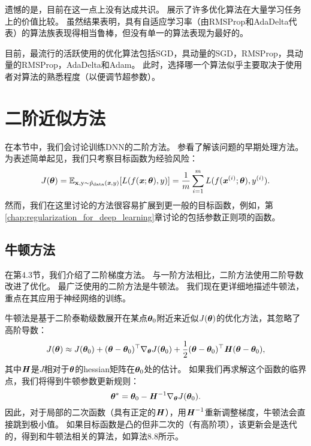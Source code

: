 遗憾的是，目前在这一点上没有达成共识。
\cite{Schaul2014_unittests}展示了许多优化算法在大量学习任务上的价值比较。
虽然结果表明，具有自适应学习率（由RMSProp和AdaDelta代表）的算法族表现得相当鲁棒，但没有单一的算法表现为最好的。

目前，最流行的活跃使用的优化算法包括SGD，具动量的SGD，RMSProp，具动量的RMSProp，AdaDelta和Adam。
此时，选择哪一个算法似乎主要取决于使用者对算法的熟悉程度（以便调节超参数）。

\section{二阶近似方法}
\label{sec:approximate_second_order_methods}
在本节中，我们会讨论训练\gls{DNN}的二阶方法。
参看\cite{lecun1998mnist}了解该问题的早期处理方法。
为表述简单起见，我们只考察目标函数为经验风险：
\begin{equation}
    J(\boldsymbol{\theta}) = \mathbb{E}_{\mathbf{x}, \mathrm{y} \sim \hat{p}_{\text{data}}(\boldsymbol{\mathit{x}},y) } [ L(f(\boldsymbol{\mathit{x}}; \boldsymbol{\theta}), y) ] =
\frac{1}{m} \sum_{i=1}^m L(f(\boldsymbol{\mathit{x}}^{(i)}; \boldsymbol{\theta}), y^{(i)}).
\end{equation}
然而，我们在这里讨论的方法很容易扩展到更一般的目标函数，例如，第\ref{chap:regularization_for_deep_learning}章讨论的包括参数正则项的函数。


\subsection{牛顿方法}
\label{sec:newton_method}
在第4.3节，我们介绍了二阶梯度方法。
与一阶方法相比，二阶方法使用二阶导数改进了优化。
最广泛使用的二阶方法是牛顿法。
我们现在更详细地描述牛顿法，重点在其应用于神经网络的训练。

牛顿法是基于二阶泰勒级数展开在某点$\boldsymbol{\theta}_0$附近来近似$J(\boldsymbol{\theta})$的优化方法，其忽略了高阶导数：
\begin{equation}
    J(\boldsymbol{\theta}) \approx J(\boldsymbol{\theta}_0) + (\boldsymbol{\theta} - \boldsymbol{\theta}_0)^\top \nabla_{\boldsymbol{\theta}}   
    J(\boldsymbol{\theta}_0) + \frac{1}{2} (\boldsymbol{\theta} - \boldsymbol{\theta}_0)^\top \boldsymbol{\mathit{H}}(\boldsymbol{\theta} - \boldsymbol{\theta}_0),
\end{equation}
其中$\boldsymbol{\mathit{H}}$是$J$相对于$\boldsymbol{\theta}$的\gls{hessian}矩阵在$\boldsymbol{\theta}_0$处的估计。
如果我们再求解这个函数的临界点，我们将得到牛顿参数更新规则：
\begin{equation}
\label{eq:8.27}
    \boldsymbol{\theta}^* = \boldsymbol{\theta}_0 - \boldsymbol{\mathit{H}}^{-1}\nabla_{\boldsymbol{\theta}} J(\boldsymbol{\theta}_0).
\end{equation}
因此，对于局部的二次函数（具有正定的$\boldsymbol{\mathit{H}}$），用$\boldsymbol{\mathit{H}}^{-1}$重新调整梯度，牛顿法会直接跳到极小值。
如果目标函数是凸的但非二次的（有高阶项），该更新会是迭代的，得到和牛顿法相关的算法，如算法8.8所示。

